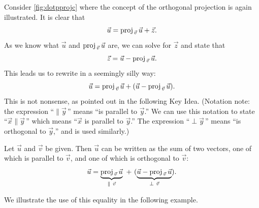 %
Consider \autoref{fig:dotpprojc} where the concept of the orthogonal projection is again illustrated. It is clear that
\begin{equation}
\vec u = \proj uv + \vec z.
\label{eq:orthogproj}
\end{equation}
As we know what $\vec u$ and $\proj uv$ are, we can solve for $\vec z$ and state that
\[\vec z = \vec u - \proj uv.\]%
This leads us to rewrite  in a seemingly silly way:
\[\vec u = \proj uv + (\vec u - \proj uv).\]
This is not nonsense, as pointed out in the following Key Idea. (Notation note: the expression ``$\parallel \vec y$\,'' means ``is parallel to $\vec y$.'' We can use this notation to state ``$\vec x\parallel\vec y$\,'' which means ``$\vec x$ is parallel to $\vec y$.'' The expression ``$\perp \vec y$\,'' means ``is orthogonal to $\vec y$,'' and is used similarly.)

\begin{keyidea}\label{idea:orthog_proj}%
Let $\vec u$ and $\vec v$ be given. Then $\vec u$ can be written as the sum of two vectors, one of which is parallel to $\vec v$, and one of which is orthogonal to $\vec v$:
\[\vec u = \underbrace{\proj uv}_{\parallel\ \vec v}\ +\  (\underbrace{\vec u-\proj uv}_{\perp\ \vec v}).\]
\end{keyidea}

We illustrate the use of this equality in the following example.


